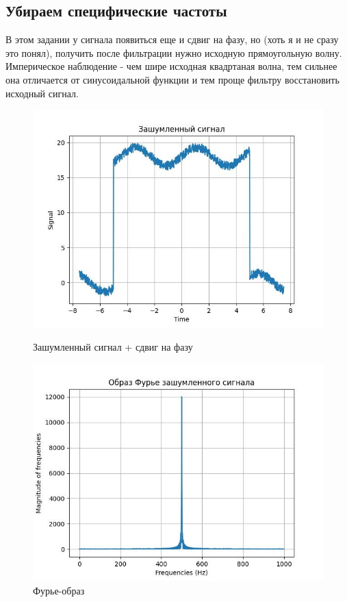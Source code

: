     \subsection{Убираем специфические частоты}
    \noindent В этом задании у сигнала появиться еще и сдвиг на фазу, но (хоть я и не сразу это понял), получить после фильтрации нужно исходную прямоугольную волну. Империческое наблюдение - чем шире исходная квадртаная волна, тем сильнее она отличается от синусоидальной функции и тем проще фильтру восстановить исходный сигнал.
    \begin{figure}[!htb]
        \includegraphics[width=\linewidth]{../images/result/orginal_s3.jpeg}
        \caption{Зашумленный сигнал + сдвиг на фазу}
      \endminipage\hfill
        \includegraphics[width=\linewidth]{../images/result/original_s3_fourier.jpeg}
        \caption{Фурье-образ}
      \endminipage\hfill
      \end{figure}

